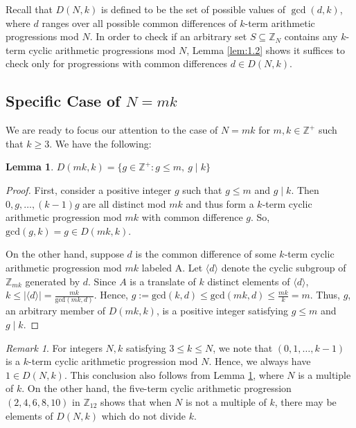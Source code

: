 \documentclass{article}
\newtheorem{lemma}[theorem]{Lemma}
\theoremstyle{definition}
\theoremstyle{remark}
\newtheorem*{remark}{Remark}
\begin{document}
Recall that $D(N,k)$ is defined to be the set of possible values of $\gcd(d,k)$, where $d$ ranges over all possible common differences of $k$-term arithmetic progressions mod $N$. In order to check if an arbitrary set $S \subseteq \mathbb{Z}_{N}$ contains any $k$-term cyclic arithmetic progressions mod $N$, Lemma \ref{lem:1.2} shows it suffices to check only for progressions with common differences $d \in D(N,k)$.

\subsection{Specific Case of  $N=mk$}
We are ready to focus our attention to the case of $N = mk$ for $m,k \in \mathbb{Z}^+$ such that $k \geq 3$. We have the following:

\begin{lemma}
\label{prop:2.1}
    $D(mk,k) = \{g \in \mathbb{Z}^{+} : g \leq m, \ g \mid k\}$
\end{lemma}

\begin{proof}
    First, consider a positive integer $g$ such that $g \leq m$ and $g \mid k$. Then $0, g, \ldots, (k-1)g$ are all distinct mod $mk$ and thus form a $k$-term cyclic arithmetic progression mod $mk$ with common difference $g$. So, $\text{gcd}(g,k) = g \in D(mk,k)$.

    On the other hand, suppose $d$ is the common difference of some $k$-term cyclic arithmetic progression mod $mk$ labeled A. Let $\langle d \rangle$ denote the cyclic subgroup of $\mathbb{Z}_{mk}$ generated by $d$. Since $A$ is a translate of $k$ distinct elements of $\langle d \rangle$, $k \leq |\langle d \rangle | = \frac{mk}{\text{gcd}(mk,d)}$. Hence, $g := \text{gcd}(k,d) \leq \text{gcd}(mk,d) \leq \frac{mk}{k} = m$. Thus, $g$, an arbitrary member of $D(mk,k)$, is a positive integer satisfying $g \leq m$ and $g \mid k$.
\end{proof}

\begin{remark}
    For integers $N,k$ satisfying $3 \leq k \leq N$, we note that $(0, 1, \ldots, k-1)$ is a $k$-term cyclic arithmetic progression mod $N$. Hence, we always have $1 \in D(N,k)$. This conclusion also follows from Lemma \ref{prop:2.1}, where $N$ is a multiple of $k$. On the other hand, the five-term cyclic arithmetic progression $(2,4,6,8,10)$ in $\mathbb{Z}_{12}$ shows that when $N$ is not a multiple of $k$, there may be elements of $D(N,k)$ which do not divide $k$.
\end{remark}
\end{document}
